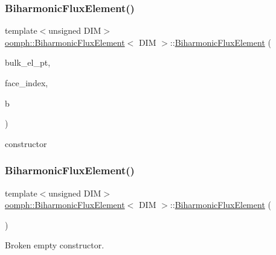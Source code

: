 \subsubsection{\texorpdfstring{Biharmonic\+Flux\+Element()}{BiharmonicFluxElement()}\hspace{0.1cm}{\footnotesize\ttfamily [1/4]}}
{\footnotesize\ttfamily template$<$unsigned D\+IM$>$ \\
\hyperlink{classoomph_1_1BiharmonicFluxElement}{oomph\+::\+Biharmonic\+Flux\+Element}$<$ D\+IM $>$\+::\hyperlink{classoomph_1_1BiharmonicFluxElement}{Biharmonic\+Flux\+Element} (\begin{DoxyParamCaption}\item[{\hyperlink{classoomph_1_1FiniteElement}{Finite\+Element} $\ast$const \&}]{bulk\+\_\+el\+\_\+pt,  }\item[{const int \&}]{face\+\_\+index,  }\item[{const unsigned \&}]{b }\end{DoxyParamCaption})}



constructor 

\mbox{\label{classoomph_1_1BiharmonicFluxElement_ab640d11e2bc26ac42a639fb2ed0627c2}} 
\subsubsection{\texorpdfstring{Biharmonic\+Flux\+Element()}{BiharmonicFluxElement()}\hspace{0.1cm}{\footnotesize\ttfamily [2/4]}}
{\footnotesize\ttfamily template$<$unsigned D\+IM$>$ \\
\hyperlink{classoomph_1_1BiharmonicFluxElement}{oomph\+::\+Biharmonic\+Flux\+Element}$<$ D\+IM $>$\+::\hyperlink{classoomph_1_1BiharmonicFluxElement}{Biharmonic\+Flux\+Element} (\begin{DoxyParamCaption}{ }\end{DoxyParamCaption})\hspace{0.3cm}{\ttfamily [inline]}}



Broken empty constructor. 



